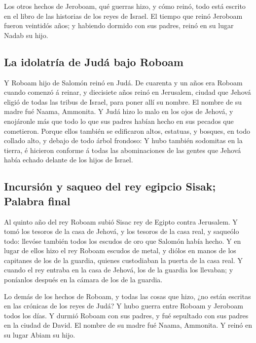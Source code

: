  Los otros hechos de Jeroboam, qué guerras hizo, y cómo
reinó, todo está escrito en el libro de las historias de los reyes de
Israel.  El tiempo que reinó Jeroboam fueron veintidós
años; y habiendo dormido con sus padres, reinó en su lugar Nadab su
hijo.

\hypertarget{la-idolatruxeda-de-juduxe1-bajo-roboam}{%
\subsection{La idolatría de Judá bajo
Roboam}\label{la-idolatruxeda-de-juduxe1-bajo-roboam}}

 Y Roboam hijo de Salomón reinó en Judá. De cuarenta y un
años era Roboam cuando comenzó á reinar, y diecisiete años reinó en
Jerusalem, ciudad que Jehová eligió de todas las tribus de Israel, para
poner allí su nombre. El nombre de su madre fué Naama, Ammonita.
 Y Judá hizo lo malo en los ojos de Jehová, y enojáronle
más que todo lo que sus padres habían hecho en sus pecados que
cometieron.  Porque ellos también se edificaron altos,
estatuas, y bosques, en todo collado alto, y debajo de todo árbol
frondoso:  Y hubo también sodomitas en la tierra, é
hicieron conforme á todas las abominaciones de las gentes que Jehová
había echado delante de los hijos de Israel.

\hypertarget{incursiuxf3n-y-saqueo-del-rey-egipcio-sisak-palabra-final}{%
\subsection{Incursión y saqueo del rey egipcio Sisak; Palabra
final}\label{incursiuxf3n-y-saqueo-del-rey-egipcio-sisak-palabra-final}}

 Al quinto año del rey Roboam subió Sisac rey de Egipto
contra Jerusalem.  Y tomó los tesoros de la casa de Jehová,
y los tesoros de la casa real, y saqueólo todo: llevóse también todos
los escudos de oro que Salomón había hecho.  Y en lugar de
ellos hizo el rey Roboam escudos de metal, y diólos en manos de los
capitanes de los de la guardia, quienes custodiaban la puerta de la casa
real.  Y cuando el rey entraba en la casa de Jehová, los de
la guardia los llevaban; y poníanlos después en la cámara de los de la
guardia.

 Lo demás de los hechos de Roboam, y todas las cosas que
hizo, ¿no están escritas en las crónicas de los reyes de Judá?
 Y hubo guerra entre Roboam y Jeroboam todos los días.
 Y durmió Roboam con sus padres, y fué sepultado con sus
padres en la ciudad de David. El nombre de su madre fué Naama, Ammonita.
Y reinó en su lugar Abiam su hijo.

